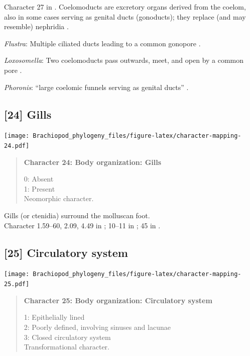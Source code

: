\documentclass[openany]{book}
\begin{document}
Character 27 in \citet{Haszprunar2000}. Coelomoducts are excretory
organs derived from the coelom, also in some cases serving as genital
ducts (gonoducts); they replace (and may resemble) nephridia
\citep{Goodrich1945}.

\hypertarget{Flustra-coding-23}{}
\emph{Flustra}: Multiple ciliated ducts leading to a common gonopore
\citep{Goodrich1945}.

\hypertarget{Loxosomella-coding-23}{}
\emph{Loxosomella}: Two coelomoducts pass outwards, meet, and open by a
common pore \citep{Goodrich1945}.

\hypertarget{Phoronis-coding-23}{}
\emph{Phoronis}: ``large coelomic funnels serving as genital ducts''
\citep{Goodrich1945}.

\subsection*{{[}24{]} Gills}\label{gills}

\texttt{[image: Brachiopod\_phylogeny\_files/figure-latex/character-mapping-24.pdf]}

\begin{quote}
\textbf{Character 24: Body organization: Gills}

0: Absent\\
1: Present\\
Neomorphic character.
\end{quote}

Gills (or ctenidia) surround the molluscan foot.\\
Character 1.59--60, 2.09, 4.49 in \citet{SPS1996}; 10--11 in
\citet{Haszprunar2000}; 45 in \citet{Sutton2012}.

\subsection*{{[}25{]} Circulatory system}\label{circulatory-system}

\texttt{[image: Brachiopod\_phylogeny\_files/figure-latex/character-mapping-25.pdf]}

\begin{quote}
\textbf{Character 25: Body organization: Circulatory system}

1: Epithelially lined\\
2: Poorly defined, involving sinuses and lacunae\\
3: Closed circulatory system\\
Transformational character.
\end{quote}
\end{document}
